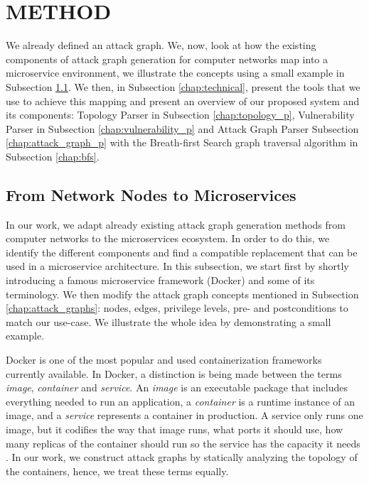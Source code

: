 \section{METHOD}
\label{chap:method}
We already defined an attack graph. We, now, look at how the existing components of attack graph generation for computer networks map into a microservice environment, we illustrate the concepts using a small example in Subsection \ref{chap:mapping}. We then, in Subsection \ref{chap:technical}, present the tools that we use to achieve this mapping and present an overview of our proposed system and its components: Topology Parser in Subsection \ref{chap:topology_p}, Vulnerability Parser in Subsection \ref{chap:vulnerability_p} and Attack Graph Parser Subsection \ref{chap:attack_graph_p} with the Breath-first Search graph traversal algorithm in Subsection \ref{chap:bfs}. 


\subsection{From Network Nodes to Microservices}
\label{chap:mapping}
In our work, we adapt already existing attack graph generation methods from computer networks to the microservices ecosystem. In order to do this, we identify the different components and find a compatible replacement that can be used in a microservice architecture. In this subsection, we start first by shortly introducing a famous microservice framework (Docker) and some of its terminology. We then modify the attack graph concepts mentioned in Subsection \ref{chap:attack_graphs}: nodes, edges, privilege levels, pre- and postconditions to match our use-case. We illustrate the whole idea  by demonstrating a small example.

Docker is one of the most popular and used containerization frameworks currently available. In Docker, a distinction is being made between the terms \textit{image}, \textit{container} and \textit{service}. An \textit{image} is an executable package that includes everything needed to run an application, a \textit{container} is a runtime instance of an image, and a \textit{service} represents a container in production. A service only runs one image, but it codifies the way that image runs, what ports it should use, how many replicas of the container should run so the service has the capacity it needs \cite{merkel2014docker}. In our work, we construct attack graphs by statically analyzing the topology of the containers, hence, we treat these terms equally.  

